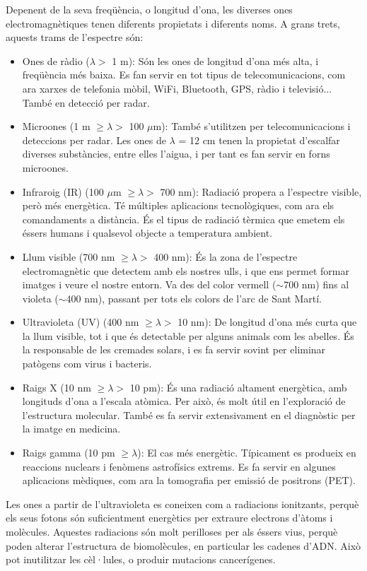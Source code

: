 \documentclass[12pt]{book}
\begin{document}
Depenent de la seva freqüència, o longitud d'ona, les diverses ones electromagnètiques tenen diferents propietats i diferents noms. A grans trets, aquests trams de l'espectre són:
%
\begin{itemize}
    \item Ones de ràdio ($\lambda >$ 1 m): Són les ones de longitud d'ona més alta, i freqüència més baixa. Es fan servir en tot tipus de telecomunicacions, com ara xarxes de telefonia mòbil, WiFi, Bluetooth, GPS, ràdio i televisió... També en detecció per radar.
    \item Microones (1 m $ \geq \lambda >$ 100 $\mu$m): També s'utilitzen per telecomunicacions i deteccions per radar. Les ones de $\lambda$ = 12 cm tenen la propietat d'escalfar diverses substàncies, entre elles l'aigua, i per tant es fan servir en forns microones.
    \item Infraroig (IR) (100 $\mu$m $ \geq \lambda >$ 700 nm): Radiació propera a l'espectre visible, però més energètica. Té múltiples aplicacions tecnològiques, com ara els comandaments a distància. És el tipus de radiació tèrmica que emetem els éssers humans i qualsevol objecte a temperatura ambient.
    \item Llum visible (700 nm $ \geq \lambda >$ 400 nm): És la zona de l'espectre electromagnètic que detectem amb els nostres ulls, i que ens permet formar imatges i veure el nostre entorn. Va des del color vermell ($\sim$700 nm) fins al violeta ($\sim$400 nm), passant per tots els colors de l'arc de Sant Martí.
    \item Ultravioleta (UV) (400 nm $ \geq \lambda >$ 10 nm): De longitud d'ona més curta que la llum visible, tot i que és detectable per alguns animals com les abelles. És la responsable de les cremades solars, i es fa servir sovint per eliminar patògens com virus i bacteris.
    \item Raigs X (10 nm $ \geq \lambda >$ 10 pm): És una radiació altament energètica, amb longituds d'ona a l'escala atòmica. Per això, és molt útil en l'exploració de l'estructura molecular. També es fa servir extensivament en el diagnòstic per la imatge en medicina.
    \item Raigs gamma (10 pm $ \geq \lambda$): El cas més energètic. Típicament es produeix en reaccions nuclears i fenòmens astrofísics extrems. Es fa servir en algunes aplicacions mèdiques, com ara la tomografia per emissió de positrons (PET).
\end{itemize}

Les ones a partir de l'ultravioleta es coneixen com a radiacions ionitzants, perquè els seus fotons són suficientment energètics per extraure electrons d'àtoms i molècules. Aquestes radiacions són molt perilloses per als éssers vius, perquè poden alterar l'estructura de biomolècules, en particular les cadenes d'ADN. Això pot inutilitzar les cèl·lules, o produir mutacions cancerígenes.   
\end{document}
